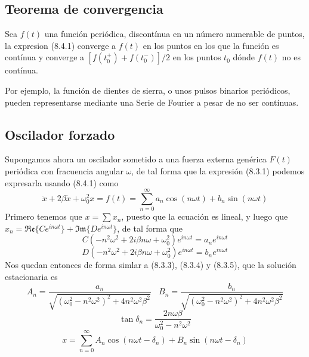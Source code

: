 \subsection{Teorema de convergencia}
Sea $f(t)$ una función periódica, discontínua en un número numerable de puntos, la expresion (8.4.1) converge a $f(t)$ en los puntos en los que la función es contínua y converge a $[f(t_0^+) + f(t_0^-)]/2$ en los puntos $t_0$ dónde $f(t)$ no es contínua.

Por ejemplo, la función de dientes de sierra, o unos pulsos binarios periódicos, pueden representarse mediante una Serie de Fourier a pesar de no ser contínuas.
\subsection{Oscilador forzado}
Supongamos ahora un oscilador sometido a una fuerza externa genérica $F(t)$ periódica con fracuencia angular $\omega$, de tal forma que la expresión (8.3.1) podemos expresarla usando (8.4.1) como
\begin{equation} \label{6.1.1}
    \ddot{x} +2\beta \dot{x} +\omega_0^2 x = f(t) = \sum_{n=0}^\infty a_n \cos (n\omega t) + b_n \sin (n\omega t)
\end{equation}
Primero tenemos que $x = \sum x_n$, puesto que la ecuación es lineal, y luego que $x_n = \mathfrak{Re}\{Ce^{in\omega t}\}+\mathfrak{Im}\{De^{in\omega t}\}$, de tal forma que 
\begin{equation} \label{6.1.1}
    C(-n^2\omega^2 +2 i\beta n\omega +\omega_0^2)e^{in\omega t} = a_n e^{in\omega t}
\end{equation}
\vspace{-20pt}
\begin{equation} \label{6.1.1}
    D(-n^2\omega^2 +2 i\beta n\omega +\omega_0^2)e^{in\omega t} = b_n e^{in\omega t}
\end{equation}
Nos quedan entonces de forma simlar a (8.3.3), (8.3.4) y (8.3.5), que la solución estacionaria es 
\begin{equation} \label{6.1.1}
    A_n = \frac{a_n}{\sqrt{\left(\omega_0^2 -n^2\omega^2\right)^2+4n^2\omega^2 \beta^2}} \ \ \ \ B_n = \frac{b_n}{\sqrt{\left(\omega_0^2 -n^2\omega^2\right)^2+4n^2\omega^2 \beta^2}}
\end{equation}
\begin{equation} \label{6.1.1}
    \tan \delta_n = \frac{2n\omega \beta}{\omega_0^2 - n^2\omega^2}
\end{equation}
\begin{equation} \label{6.1.1}
    x =  \sum_{n=0}^\infty A_n \cos(n\omega t - \delta_n) + B_n\sin(n\omega t - \delta_n)
\end{equation}